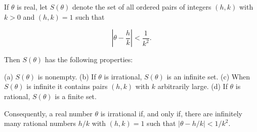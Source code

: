 If $\theta$ is real, let $S(\theta)$ denote the set of all ordered pairs of integers $(h, k)$ with $k > 0$ and $(h, k) = 1$ such that

$$\left| \theta - \frac{h}{k} \right| < \frac{1}{k^2}.$$

Then $S(\theta)$ has the following properties:

(a) $S(\theta)$ is nonempty.
(b) If $\theta$ is irrational, $S(\theta)$ is an infinite set.
(c) When $S(\theta)$ is infinite it contains pairs $(h, k)$ with $k$ arbitrarily large.
(d) If $\theta$ is rational, $S(\theta)$ is a finite set.

Consequently, a real number $\theta$ is irrational if, and only if, there are infinitely many rational numbers $h/k$ with $(h,k)=1$ such that $|\theta - h/k| < 1/k^2$.
